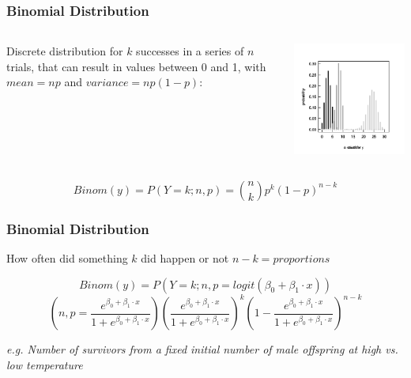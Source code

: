 \documentclass{beamer}
\begin{document}
\begin{frame}[fragile]
    \frametitle{Binomial Distribution}
    \large
    \begin{columns}
        \begin{column}{0.5\textwidth}
            Discrete distribution for $k$ successes in a series of $n$ trials, that can result in values between 0 and 1, with $mean = np$ and $variance = np(1 - p)$:
        \end{column}
        \begin{column}{0.5\textwidth}
            \includegraphics[width=\textwidth]{lectures/day_9_refreshing_glm/figures/unnamed-chunk-6-1.png}
        \end{column}
    \end{columns}
    \vspace{0.2cm}
    
    \[
    Binom(y) = P(Y = k; n, p) = \binom{n}{k} p^k(1 - p)^{n-k}
    \]

\end{frame}

\begin{frame}
\frametitle{Binomial Distribution}
    \large
    How often did something $k$ did happen or not $n-k = proportions$

    \[
    Binom(y) = P(Y = k; n, p = logit(\beta_0 + \beta_1 \cdot x))
    \]
    \[
    \left( n, p = \frac{e^{\beta_0 + \beta_1 \cdot x}}{1 + e^{\beta_0 + \beta_1 \cdot x}} \right) \left( \frac{e^{\beta_0 + \beta_1 \cdot x}}{1 + e^{\beta_0 + \beta_1 \cdot x}} \right)^k \left( 1 - \frac{e^{\beta_0 + \beta_1 \cdot x}}{1 + e^{\beta_0 + \beta_1 \cdot x}} \right)^{n-k}
    \]
    \vspace{0.2cm}
    
    \textit{e.g. Number of survivors from a fixed initial number of male offspring at high vs. low temperature}
\end{frame}
\end{document}
